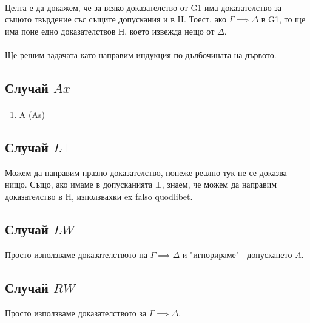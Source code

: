 \documentclass[12pt]{article}
\begin{document}
\newcommand\alphaeq{\mathrel{\stackrel{\makebox[0pt]{\mbox{\normalfont\tiny $\alpha$}}}{=}}}
\newcommand\betaeq{\mathrel{\stackrel{\makebox[0pt]{\mbox{\normalfont\tiny $\beta$}}}{=}}}
\newcommand\betaetaeq{\mathrel{\stackrel{\makebox[0pt]{\mbox{\normalfont\tiny $\beta\eta$}}}{=}}}

\paragraph*{}
Целта е да докажем, че за всяко доказателство от G1 има доказателство за същото твърдение със същите допускания и в H. Тоест, ако $\Gamma \implies \Delta$ в G1, то ще има поне едно доказателствов Н, което извежда нещо от $\Delta$.

\paragraph*{}
Ще решим задачата като направим индукция по дълбочината на дървото. 

\subsection*{Случай $Ax$}
\paragraph*{}
\begin{enumerate}
    \item A (As)
\end{enumerate}

\subsection*{Случай $L \bot$}
Можем да направим празно доказателство, понеже реално тук не се доказва нищо. Също, ако имаме в допусканията $\bot$, знаем, че можем да направим доказателство в H, използвахки ex falso quodlibet.

\subsection*{Случай $LW$}
Просто използваме доказателството на $\Gamma \implies \Delta$ и "игнорираме" $\;$ допускането $A$. 

\subsection*{Случай $RW$}
Просто използваме доказателството за $\Gamma \implies \Delta$.
\end{document}
